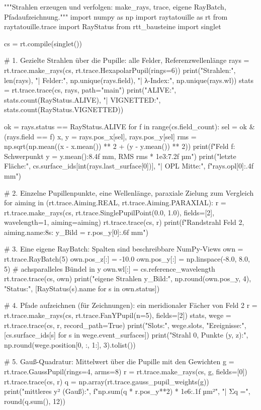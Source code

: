 \documentclass[11pt,a4paper,openany]{book}
\DeclareRobustCommand{\code}[1]{\texttt{\directlua{rttcode("\luaescapestring{\detokenize{#1}}")}}}
\begin{document}
\begin{pycode}[title={\code{ex08_strahlen.py}}]
"""Strahlen erzeugen und verfolgen: make_rays, trace, eigene RayBatch, Pfadaufzeichnung."""
import numpy as np
import raytatouille as rt
from raytatouille.trace import RayStatus
from rtt_bausteine import singlet

cs = rt.compile(singlet())

# 1. Gezielte Strahlen über die Pupille: alle Felder, Referenzwellenlänge
rays = rt.trace.make_rays(cs, rt.trace.HexapolarPupil(rings=6))
print("Strahlen:", len(rays), "| Felder:", np.unique(rays.field), "| λ-Index:", np.unique(rays.wl))
stats = rt.trace.trace(cs, rays, path="main")
print("ALIVE:", stats.count(RayStatus.ALIVE), "| VIGNETTED:", stats.count(RayStatus.VIGNETTED))

ok = rays.status == RayStatus.ALIVE
for f in range(cs.field_count):
    sel = ok & (rays.field == f)
    x, y = rays.pos_x[sel], rays.pos_y[sel]
    rms = np.sqrt(np.mean((x - x.mean()) ** 2 + (y - y.mean()) ** 2))
    print(f"Feld {f}: Schwerpunkt y = {y.mean():8.4f} mm, RMS {rms * 1e3:7.2f} µm")
print("letzte Fläche:", cs.surface_ids[int(rays.last_surface[0])],
      "| OPL Mitte:", f"{rays.opl[0]:.4f} mm")

# 2. Einzelne Pupillenpunkte, eine Wellenlänge, paraxiale Zielung zum Vergleich
for aiming in (rt.trace.Aiming.REAL, rt.trace.Aiming.PARAXIAL):
    r = rt.trace.make_rays(cs, rt.trace.SinglePupilPoint(0.0, 1.0), fields=[2],
                           wavelength=1, aiming=aiming)
    rt.trace.trace(cs, r)
    print(f"Randstrahl Feld 2, {aiming.name:8s}: y_Bild = {r.pos_y[0]:.6f} mm")

# 3. Eine eigene RayBatch: Spalten sind beschreibbare NumPy-Views
own = rt.trace.RayBatch(5)
own.pos_z[:] = -10.0
own.pos_y[:] = np.linspace(-8.0, 8.0, 5)          # achsparalleles Bündel in y
own.wl[:] = cs.reference_wavelength
rt.trace.trace(cs, own)
print("eigene Strahlen y_Bild:", np.round(own.pos_y, 4), "Status:",
      [RayStatus(s).name for s in own.status])

# 4. Pfade aufzeichnen (für Zeichnungen): ein meridionaler Fächer von Feld 2
r = rt.trace.make_rays(cs, rt.trace.FanYPupil(n=5), fields=[2])
stats, wege = rt.trace.trace(cs, r, record_path=True)
print("Slots:", wege.slots, "Ereignisse:", [cs.surface_ids[s] for s in wege.event_surfaces])
print("Strahl 0, Punkte (y, z):", np.round(wege.position[0, :, 1:], 3).tolist())

# 5. Gauß-Quadratur: Mittelwert über die Pupille mit den Gewichten
g = rt.trace.GaussPupil(rings=4, arms=8)
r = rt.trace.make_rays(cs, g, fields=[0])
rt.trace.trace(cs, r)
q = np.array(rt.trace.gauss_pupil_weights(g))
print("mittleres y² (Gauß):", f"{np.sum(q * r.pos_y**2) * 1e6:.1f} µm²", "| Σq =", round(q.sum(), 12))
\end{pycode}
\end{document}
